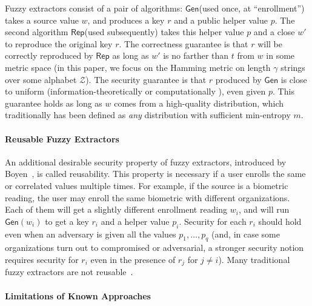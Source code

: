\documentclass[11pt]{article}
\newcommand{\class}[1]{{\ensuremath{\mathsf{#1}}}}
\newcommand{\gen}{\ensuremath{\class{Gen}}\xspace}
\newcommand{\rep}{\ensuremath{\class{Rep}}\xspace}
\begin{document}
Fuzzy extractors consist of a pair of algorithms: \gen (used once, at ``enrollment'') takes a source value $w$, and produces a key $r$ and a public helper value $p$.  The second algorithm \rep (used subsequently) takes this helper value $p$ and a close $w'$ to reproduce the original key $r$. 
The correctness guarantee is that $r$ will be correctly reproduced by \rep as long as $w'$ is no farther than $t$ from $w$ in some metric space (in this paper, we focus on the Hamming metric on length $\gamma$ strings over some alphabet $\mathcal{Z}$).
 The security guarantee is that $r$ produced by \gen is close to uniform (information-theoretically \cite{DBLP:journals/siamcomp/DodisORS08} or computationally \cite{fuller2013computational}), even given $p$. This guarantee holds as long as $w$ comes from a high-quality distribution, which
traditionally has been defined as \emph{any} distribution with sufficient min-entropy $m$. 

\paragraph{Reusable Fuzzy Extractors}
An additional desirable security property of fuzzy extractors, introduced by Boyen~\cite{Boyen2004}, is called reusability. This property is necessary if a user enrolls the same or correlated values multiple times. For example, if the source is a biometric reading, the user may enroll the same biometric with different organizations.  Each of them will get a slightly different enrollment reading $w_i$, and will run $\gen(w_i)$ to get a key $r_i$ and a helper value $p_i$. Security for each $r_i$ should hold even when an adversary is given all the values $p_1, \dots, p_q$ (and, in case some organizations turn out to compromised or adversarial, a stronger security notion requires security for $r_i$ even in the presence of $r_j$ for $j\neq i$).  Many traditional fuzzy extractors are not reusable~\cite{Boyen2004,simoens2009privacy,blanton2012non,blanton2013analysis}.


\paragraph{Limitations of Known Approaches}
\end{document}
